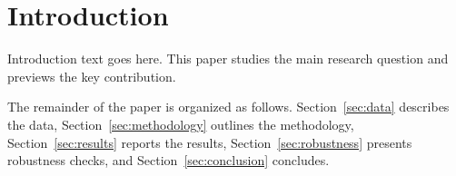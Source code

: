 \section{Introduction}

Introduction text goes here. This paper studies the main research question and previews the key contribution.

The remainder of the paper is organized as follows. Section~\ref{sec:data} describes the data, Section~\ref{sec:methodology} outlines the methodology, Section~\ref{sec:results} reports the results, Section~\ref{sec:robustness} presents robustness checks, and Section~\ref{sec:conclusion} concludes.
